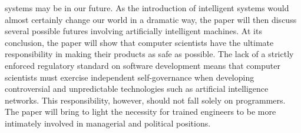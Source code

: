 systems may be in our future. As the introduction of intelligent systems would almost
certainly change our world in a dramatic way, the paper will then discuss several possible
futures involving artificially intelligent machines. At its conclusion, the paper will show
that computer scientists have the ultimate responsibility in making their products as safe as possible. The lack of a strictly enforced regulatory standard on software development
means that computer scientists must exercise independent self-governance when
developing controversial and unpredictable technologies such as artificial intelligence
networks. This responsibility, however, should not fall solely on programmers. The
paper will bring to light the necessity for trained engineers to be more intimately involved
in managerial and political positions.



